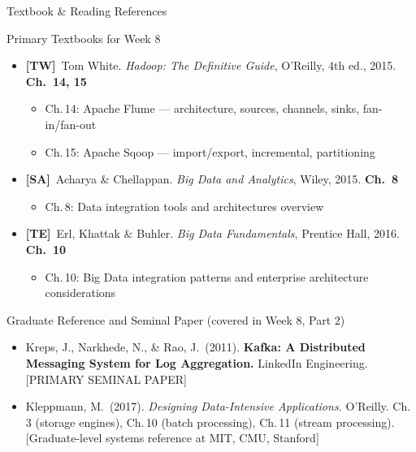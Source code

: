 \documentclass[aspectratio=169,10pt]{beamer}
\begin{document}
\begin{frame}{Textbook \& Reading References}
  \begin{block}{Primary Textbooks for Week 8}
    \begin{itemize}
      \item \textbf{[TW]}\ Tom White. \textit{Hadoop: The Definitive Guide}, O'Reilly, 4th ed., 2015.
            \hfill \textbf{Ch.\ 14, 15}
            \begin{itemize}
              \small\item Ch.\,14: Apache Flume — architecture, sources, channels, sinks, fan-in/fan-out
              \item Ch.\,15: Apache Sqoop — import/export, incremental, partitioning
            \end{itemize}
      \item \textbf{[SA]}\ Acharya \& Chellappan. \textit{Big Data and Analytics}, Wiley, 2015.
            \hfill \textbf{Ch.\ 8}
            \begin{itemize}
              \small\item Ch.\,8: Data integration tools and architectures overview
            \end{itemize}
      \item \textbf{[TE]}\ Erl, Khattak \& Buhler. \textit{Big Data Fundamentals}, Prentice Hall, 2016.
            \hfill \textbf{Ch.\ 10}
            \begin{itemize}
              \small\item Ch.\,10: Big Data integration patterns and enterprise architecture considerations
            \end{itemize}
    \end{itemize}
  \end{block}
  \vspace{4pt}
  \begin{exampleblock}{Graduate Reference and Seminal Paper (covered in Week 8, Part 2)}
    \begin{itemize}
      \small
      \item Kreps, J., Narkhede, N., \& Rao, J.\ (2011). \textbf{Kafka: A Distributed Messaging System for Log Aggregation.} LinkedIn Engineering. [PRIMARY SEMINAL PAPER]
      \item Kleppmann, M.\ (2017). \textit{Designing Data-Intensive Applications.} O'Reilly. Ch.\,3 (storage engines), Ch.\,10 (batch processing), Ch.\,11 (stream processing). [Graduate-level systems reference at MIT, CMU, Stanford]
    \end{itemize}
  \end{exampleblock}
\end{frame}
\end{document}
